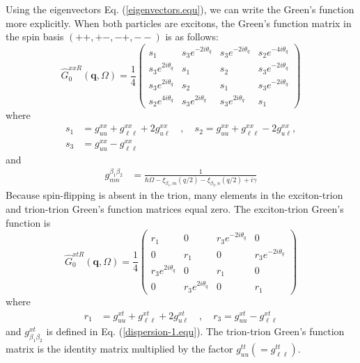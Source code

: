 \documentclass[aps,prb,superscriptaddress,letterpaper,amsmath,amssymb,twocolumn,preprintnumbers]{revtex4}
\begin{document}
Using the eigenvectors Eq. (\ref{eigenvectors.equ}), we can write the Green's function more explicitly. When both particles are excitons, the Green's function matrix in the spin basis $(++ , +- , -+ , --)$ is as follows:
\begin{equation}
\hat{G}_{0}^{x x R} (\mathbf{q},\Omega) = \frac {1} {4}
\begin{pmatrix}\label{G_0-xx.equ}
s_1 & s_3 e^{- 2 i \theta_q} & s_3 e^{- 2 i \theta_q} & s_2 e^{- 4 i \theta_q} \\
s_3 e^{2 i \theta_q} & s_1 & s_2 & s_3 e^{- 2 i \theta_q} \\
s_3 e^{2 i \theta_q} & s_2 & s_1 & s_3 e^{- 2 i \theta_q} \\
s_2 e^{4 i \theta_q} & s_3 e^{2 i \theta_q} & s_3 e^{2 i \theta_q} & s_1
\end{pmatrix}
\end{equation}
where
\begin{align}
s_1 &= g^{xx}_{uu} + g^{xx}_{\ell \ell} + 2 g^{xx}_{u \ell}\quad , \quad s_2 = g^{xx}_{uu} + g^{xx}_{\ell \ell} - 2 g^{xx}_{u \ell}, \nonumber \\
 s_3 & = g^{xx}_{uu} - g^{xx}_{\ell \ell}  \label{dispersion-1.equ}
\end{align}
and
\begin{align}
g^{\beta_1 \beta_2}_{m n} &= \frac {1} {\hbar \Omega - \xi^{}_{\beta_1 , m} ({q} / 2) - \xi^{}_{\beta_2 , n} ({q} / 2) + i \gamma}
\end{align}
Because spin-flipping is absent in the trion, many elements in the exciton-trion and trion-trion Green's function matrices equal zero. The exciton-trion Green's function is
\begin{equation}
\hat{G}_{0}^{x t R} (\mathbf{q},\Omega) = \frac {1} {4}
\begin{pmatrix}\label{G_0-xt-app.equ}
r_1 & 0 & r_3 e^{- 2 i \theta_q} & 0 \\
0 & r_1 & 0 & r_3 e^{- 2 i \theta_q} \\
r_3 e^{2 i \theta_q} & 0 & r_1 & 0 \\
0 & r_3 e^{2 i \theta_q} & 0 & r_1
\end{pmatrix}
\end{equation}
where
\begin{align}
r_1 &= g^{xt}_{uu} + g^{xt}_{\ell \ell} + 2 g^{xt}_{u \ell} \quad ,  \quad r_3 = g^{xt}_{uu} - g^{xt}_{\ell \ell}
\end{align}
and $g^{xt}_{\beta_1 \beta_2}$ is defined in Eq. (\ref{dispersion-1.equ}). The trion-trion Green's function matrix is the identity matrix multiplied by the factor $g^{tt}_{uu} (= g^{tt}_{\ell \ell})$.
\end{document}
